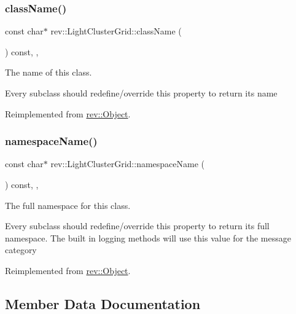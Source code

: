 \subsubsection{\texorpdfstring{className()}{className()}}
{\footnotesize\ttfamily const char$\ast$ rev\+::\+Light\+Cluster\+Grid\+::class\+Name (\begin{DoxyParamCaption}{ }\end{DoxyParamCaption}) const\hspace{0.3cm}{\ttfamily [inline]}, {\ttfamily [override]}, {\ttfamily [virtual]}}



The name of this class. 

Every subclass should redefine/override this property to return its name 

Reimplemented from \mbox{\hyperlink{classrev_1_1_object_a7a2013f91169479b65cf93afdc5d9a68}{rev\+::\+Object}}.

\mbox{\label{classrev_1_1_light_cluster_grid_a834907de0608ed380466df59dc981ff1}} 
\subsubsection{\texorpdfstring{namespaceName()}{namespaceName()}}
{\footnotesize\ttfamily const char$\ast$ rev\+::\+Light\+Cluster\+Grid\+::namespace\+Name (\begin{DoxyParamCaption}{ }\end{DoxyParamCaption}) const\hspace{0.3cm}{\ttfamily [inline]}, {\ttfamily [override]}, {\ttfamily [virtual]}}



The full namespace for this class. 

Every subclass should redefine/override this property to return its full namespace. The built in logging methods will use this value for the message category 

Reimplemented from \mbox{\hyperlink{classrev_1_1_object_aaeb638d3e10f361c56c211a318a27f3d}{rev\+::\+Object}}.



\subsection{Member Data Documentation}
\mbox{\label{classrev_1_1_light_cluster_grid_ab21de76d7e31d09537004b8cc41e1edc}} 
